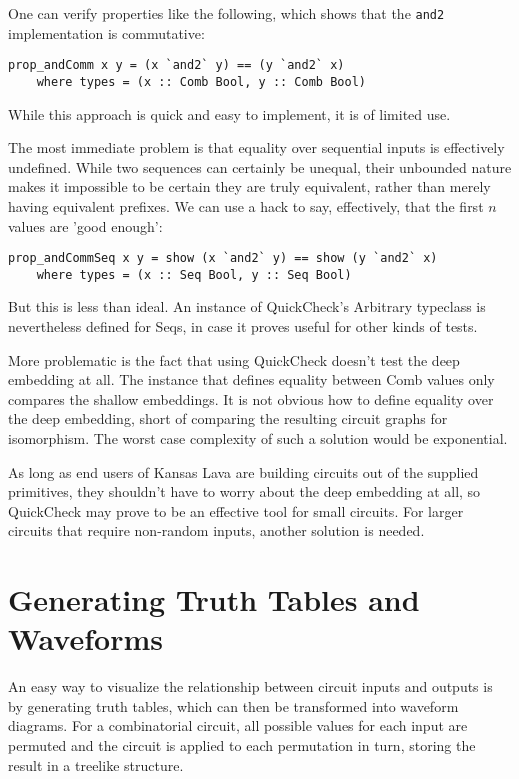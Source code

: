 \documentclass{llncs}
\begin{document}
One can verify properties like the following, which shows that the
\verb|and2| implementation is commutative:

\begin{verbatim}
prop_andComm x y = (x `and2` y) == (y `and2` x)
    where types = (x :: Comb Bool, y :: Comb Bool)
\end{verbatim}

While this approach is quick and easy to implement, it is of
limited use.

The most immediate problem is that equality over sequential
inputs is effectively undefined. While two sequences can certainly
be unequal, their unbounded nature makes it impossible to be
certain they are truly equivalent, rather than merely having
equivalent prefixes. We can use a hack to say, effectively, that
the first $n$ values are 'good enough':

\begin{verbatim}
prop_andCommSeq x y = show (x `and2` y) == show (y `and2` x)
    where types = (x :: Seq Bool, y :: Seq Bool)
\end{verbatim}

But this is less than ideal. An instance of QuickCheck's Arbitrary
typeclass is nevertheless defined for Seqs, in case it proves
useful for other kinds of tests.

More problematic is the fact that using QuickCheck doesn't test the deep
embedding at all. The instance that defines equality between
Comb values only compares the shallow embeddings. It is
not obvious how to define equality over the deep embedding,
short of comparing the resulting circuit graphs for isomorphism.
The worst case complexity of such a solution would be exponential.

As long as end users of Kansas Lava are building circuits out
of the supplied primitives, they shouldn't have to worry about
the deep embedding at all, so QuickCheck may prove to be an
effective tool for small circuits. For larger circuits that
require non-random inputs, another solution is needed.

\section{Generating Truth Tables and Waveforms}
\label{sec:waveforms}

An easy way to visualize the relationship between circuit inputs and
outputs is by generating truth tables, which can then be transformed
into waveform diagrams. For a combinatorial circuit, all possible
values for each input are permuted and the circuit is applied to each
permutation in turn, storing the result in a treelike structure.
\end{document}
